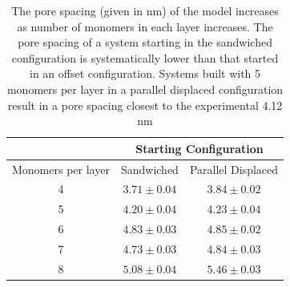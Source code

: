 \documentclass{article}
\begin{document}
  
  \begin{table}[h]
  \centering
  \begin{tabular}{ccc}
  \toprule
  		   & \multicolumn{2}{c}{Starting Configuration} \\
  \hline
  Monomers per layer & Sandwiched & Parallel Displaced \\
  \midrule
  4 & $3.71 \pm 0.04$ & $3.84 \pm 0.02$ \\
  5 & $4.20 \pm 0.04$ & $4.23 \pm 0.04$ \\
  6 & $4.83 \pm 0.03$ & $4.85 \pm 0.02$ \\
  7 & $4.73 \pm 0.03$ & $4.84 \pm 0.03$ \\
  8 & $5.08 \pm 0.04$ & $5.46 \pm 0.03$ \\
  \bottomrule
  \end{tabular}
  \caption{The pore spacing (given in nm) of the model increases as
  number of monomers in each layer increases. The pore spacing of a system
  starting in the sandwiched configuration is systematically lower than 
  that started in an offset configuration. Systems built with 5 monomers
  per layer in a parallel displaced configuration result in a pore spacing
  closest to the experimental 4.12 nm}
  \label{table:p2p} 
  \end{table}
  
\end{document}
